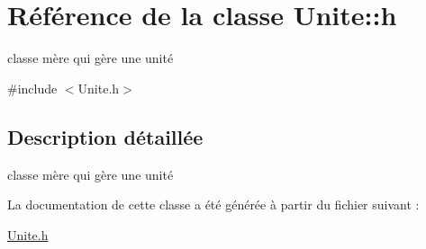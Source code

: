 \hypertarget{classUnite_1_1h}{
\section{Référence de la classe Unite::h}
\label{classUnite_1_1h}
}


classe mère qui gère une unité  




{\ttfamily \#include $<$Unite.h$>$}



\subsection{Description détaillée}
classe mère qui gère une unité 

La documentation de cette classe a été générée à partir du fichier suivant :\begin{DoxyCompactItemize}
\item 
\hyperlink{Unite_8h}{Unite.h}\end{DoxyCompactItemize}
